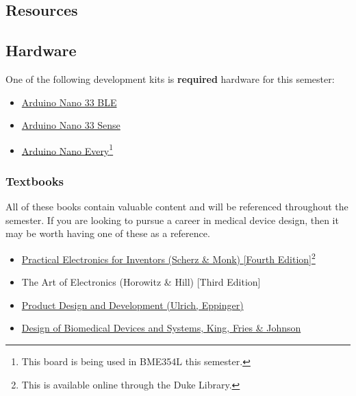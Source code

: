 \subsection*{Resources}
\subsection*{Hardware}
One of the following development kits is \textbf{required} hardware for this semester:
\begin{itemize}
    \item \href{https://store-usa.arduino.cc/products/arduino-nano-33-ble?selectedStore=us}{Arduino Nano 33 BLE} 
    \item \href{https://store-usa.arduino.cc/products/arduino-nano-33-ble-sense?selectedStore=us}{Arduino Nano 33 Sense}
    \item \href{https://store-usa.arduino.cc/products/arduino-nano-every-with-headers?selectedStore=us}{Arduino
    Nano Every}\footnote{This board is being used in BME354L this semester.}
\end{itemize}

\subsubsection*{Textbooks}
All of these books contain valuable content and will be referenced throughout
the semester.  If you are looking to pursue a career in medical device design,
then it may be worth having one of these as a reference.

\begin{itemize}
    \item \href{https://find.library.duke.edu/catalog/DUKE009381868}{Practical Electronics for Inventors (Scherz \& Monk) [Fourth Edition]}\footnote{This is available online through the Duke Library.}
    \item The Art of Electronics (Horowitz \& Hill) [Third Edition]
    \item \href{http://www.ulrich-eppinger.net/}{Product Design and Development (Ulrich, Eppinger)}
    \item \href{https://www.crcpress.com/Design-of-Biomedical-Devices-and-Systems/King-Fries-Johnson/p/book/9781466569133}{Design of Biomedical Devices and Systems, King, Fries \& Johnson}
\end{itemize}

